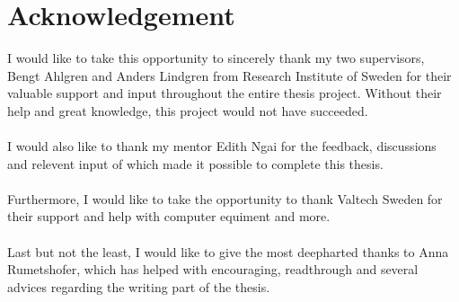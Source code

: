 \section*{Acknowledgement}

I would like to take this opportunity to sincerely thank my two supervisors, Bengt Ahlgren and Anders Lindgren from Research Institute of Sweden for their valuable support and input throughout the entire thesis project. Without their help and great knowledge, this project would not have succeeded.\\\\
I would also like to thank my mentor Edith Ngai for the feedback, discussions and relevent input of which made it possible to complete this thesis.\\\\
Furthermore, I would like to take the opportunity to thank Valtech Sweden for their support and help with computer equiment and more.\\\\
Last but not the least, I would like to give the most deepharted thanks to Anna Rumetshofer, which has helped with encouraging, readthrough and several advices regarding the writing part of the thesis.\\\\







